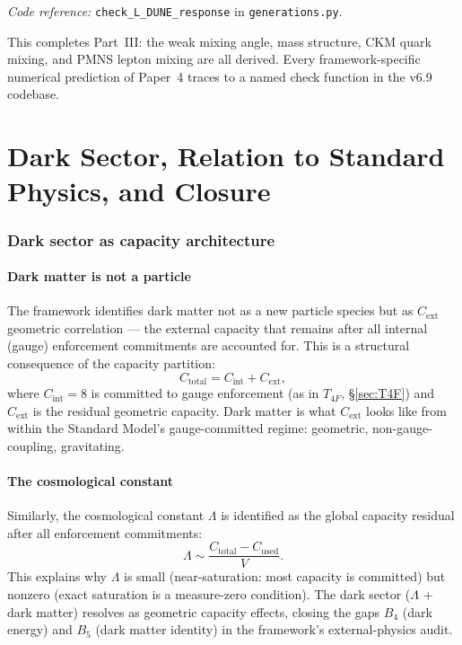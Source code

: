 \documentclass[11pt]{article}
\newcommand{\coderef}[2]{\smallskip\noindent\textit{Code reference:} \texttt{#1} in \texttt{#2}.}
\theoremstyle{definition}
\begin{document}
\coderef{check\_L\_DUNE\_response}{generations.py}

This completes Part~III: the weak mixing angle, mass structure, CKM quark mixing, and PMNS lepton mixing are all derived. Every framework-specific numerical prediction of Paper~4 traces to a named check function in the v6.9 codebase.

\clearpage

\part{Dark Sector, Relation to Standard Physics, and Closure}

\section{Dark sector as capacity architecture}\label{sec:dark_sector}

\subsection{Dark matter is not a particle}\label{sec:dm_not_particle}

The framework identifies dark matter not as a new particle species but as $C_{\mathrm{ext}}$ geometric correlation --- the external capacity that remains after all internal (gauge) enforcement commitments are accounted for. This is a structural consequence of the capacity partition:
\[
C_{\mathrm{total}} = C_{\mathrm{int}} + C_{\mathrm{ext}},
\]
where $C_{\mathrm{int}} = 8$ is committed to gauge enforcement (as in $T_{4F}$, \S\ref{sec:T4F}) and $C_{\mathrm{ext}}$ is the residual geometric capacity. Dark matter is what $C_{\mathrm{ext}}$ looks like from within the Standard Model's gauge-committed regime: geometric, non-gauge-coupling, gravitating.

\subsection{The cosmological constant}\label{sec:dm_Lambda}

Similarly, the cosmological constant $\Lambda$ is identified as the global capacity residual after all enforcement commitments:
\[
\Lambda \sim \frac{C_{\mathrm{total}} - C_{\mathrm{used}}}{V}.
\]
This explains why $\Lambda$ is small (near-saturation: most capacity is committed) but nonzero (exact saturation is a measure-zero condition). The dark sector ($\Lambda$ + dark matter) resolves as geometric capacity effects, closing the gaps $B_4$ (dark energy) and $B_5$ (dark matter identity) in the framework's external-physics audit.
\end{document}
